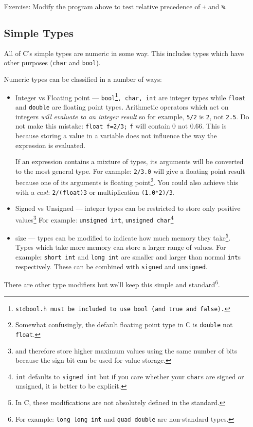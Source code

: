 \noindent Exercise: Modify the program above to test relative precedence of \texttt{+} and \texttt{\%}.

\subsection{Simple Types}
All of C's simple types are numeric in some way.
This includes types which have other purposes (\texttt{char} and \texttt{bool}).

Numeric types can be classified in a number of ways:
\begin{itemize}
 \item Integer vs Floating point --- \texttt{bool\footnote{\texttt{stdbool.h} must be included to use \texttt{bool} (and \texttt{true} and \texttt{false}).}, char, int} are integer types while \texttt{float} and \texttt{double} are floating point types.
Arithmetic operators which act on integers \emph{will evaluate to an integer result} so for example, \texttt{5/2} is \texttt{2}, not \texttt{2.5}.
Do not make this mistake:
\texttt{float f=2/3;}
\texttt{f} will contain $0$ not $0.66$.
This is because storing a value in a variable does not influence the way the expression is evaluated.

If an expression contains a mixture of types, its arguments will be converted to the most general type.
For example:
\texttt{2/3.0} will give a floating point result because one of its arguments is floating point\footnote{Somewhat confusingly, the default floating point type in C is \texttt{double} not \texttt{float}.}.
You could also achieve this with a \emph{cast}: \texttt{2/(float)3} or multiplication \texttt{(1.0*2)/3}.

 \item Signed vs Unsigned --- integer types can be restricted to store only positive values\footnote{and therefore store higher maximum values using the same number of bits because the sign bit can be used for value storage.}
 For example: \texttt{unsigned int}, \texttt{unsigned char}\footnote{\texttt{int} defaults to \texttt{signed int} but if you care whether your \texttt{char}s are signed or unsigned, it is better to be explicit.}
 
 \item size --- types can be modified to indicate how much memory they take\footnote{In C, these modifications are not absolutely defined in the standard.}. 
 Types which take more memory can store a larger range of values.
 For example:  \texttt{short int} and \texttt{long int} are smaller and larger than normal \texttt{int}s respectively.
 These can be combined with \texttt{signed} and \texttt{unsigned}.
\end{itemize}
There are other type modifiers but we'll keep this simple and standard\footnote{For example: \texttt{long long int}  and \texttt{quad double} are non-standard types.}.


